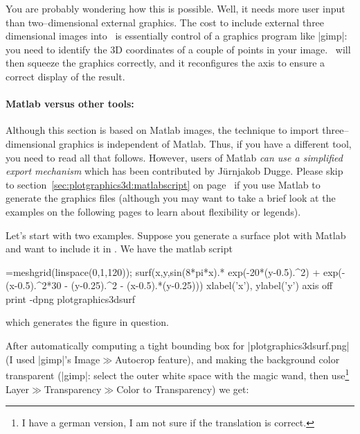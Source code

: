 {{You are probably wondering how this is possible. Well, it needs more user input than two--dimensional external graphics. The cost to include external three dimensional images into \PGFPlots\ is essentially control of a graphics program like |gimp|: you need to identify the 3D coordinates of a couple of points in your image. \PGFPlots\ will then squeeze the graphics correctly, and it reconfigures the axis to ensure a correct display of the result.

\paragraph{Matlab versus other tools:} Although this section is based on Matlab images, the technique to import three--dimensional graphics is independent of Matlab. Thus, if you have a different tool, you need to read all that follows. However, users of Matlab \emph{can use a simplified export mechanism} which has been contributed by J\"urnjakob Dugge. Please skip to section~\ref{sec:plotgraphics3d:matlabscript} on page~\pageref{sec:plotgraphics3d:matlabscript} if you use Matlab to generate the graphics files (although you may want to take a brief look at the examples on the following pages to learn about flexibility or legends).

Let's start with two examples. Suppose you generate a surface plot with Matlab and want to include it in \PGFPlots. We have the matlab script
\begin{codeexample}=meshgrid(linspace(0,1,120));
surf(x,y,sin(8*pi*x).* exp(-20*(y-0.5).^2) + exp(-(x-0.5).^2*30 - (y-0.25).^2 - (x-0.5).*(y-0.25)))
xlabel('x'), ylabel('y')
axis off
print -dpng plotgraphics3dsurf
\end{codeexample}
\noindent which generates the figure in question. 

After automatically computing a tight bounding box for |plotgraphics3dsurf.png| (I used |gimp|'s Image$\gg$Autocrop feature), and making the background color transparent (|gimp|: select the outer white space with the magic wand, then use\footnote{I have a german version, I am not sure if the translation is correct.} Layer$\gg$Transparency$\gg$Color to Transparency) we get:

{\setlength{\fboxsep}{0pt}%
\centering
{}%

}}}
